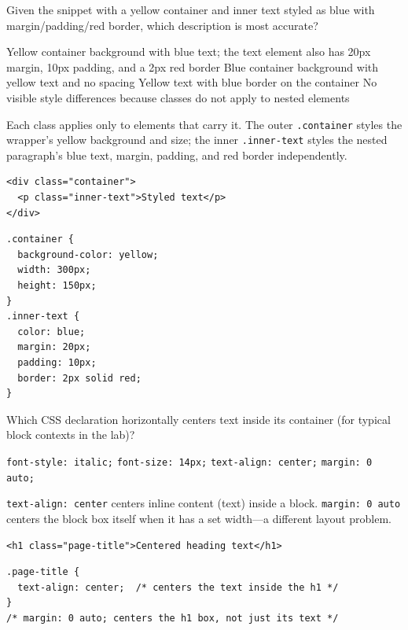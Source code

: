 \question[4]
Given the snippet with a yellow container and inner text styled as blue with margin/padding/red border, which description is most accurate?
\begin{choices}
  \CorrectChoice Yellow container background with blue text; the text element also has 20px margin, 10px padding, and a 2px red border
  \choice Blue container background with yellow text and no spacing
  \choice Yellow text with blue border on the container
  \choice No visible style differences because classes do not apply to nested elements
\end{choices}
\begin{solution}
  Each class applies only to elements that carry it. The outer \texttt{.container} styles the wrapper's yellow background and size; the inner \texttt{.inner-text} styles the nested paragraph's blue text, margin, padding, and red border independently.
\begin{lstlisting}[style=htmlinline]
<div class="container">
  <p class="inner-text">Styled text</p>
</div>
\end{lstlisting}
\begin{lstlisting}[style=cssinline]
.container {
  background-color: yellow;
  width: 300px;
  height: 150px;
}
.inner-text {
  color: blue;
  margin: 20px;
  padding: 10px;
  border: 2px solid red;
}
\end{lstlisting}
\end{solution}


\newpage

\question[4]
Which CSS declaration horizontally centers text inside its container (for typical block contexts in the lab)?
\begin{choices}
  \choice \texttt{font-style: italic;}
  \choice \texttt{font-size: 14px;}
  \CorrectChoice \texttt{text-align: center;}
  \choice \texttt{margin: 0 auto;}
\end{choices}
\begin{solution}
  \texttt{text-align: center} centers inline content (text) inside a block. \texttt{margin: 0 auto} centers the block box itself when it has a set width---a different layout problem.
\begin{lstlisting}[style=htmlinline]
<h1 class="page-title">Centered heading text</h1>
\end{lstlisting}
\begin{lstlisting}[style=cssinline]
.page-title {
  text-align: center;  /* centers the text inside the h1 */
}
/* margin: 0 auto; centers the h1 box, not just its text */
\end{lstlisting}
\end{solution}

